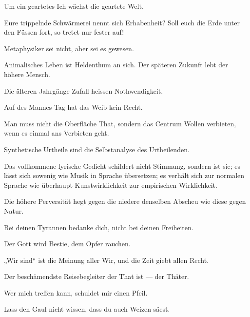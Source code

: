 Um ein geartetes Ich wächst die geartete Welt.
\par

Eure trippelnde Schwärmerei nennt sich Erhabenheit? Soll euch die Erde unter den Füssen fort, so tretet nur fester auf!
\par

Metaphysiker sei nicht, aber sei es gewesen.
\par

Animalisches Leben ist Heldenthum an sich. Der späteren Zukunft lebt der höhere Mensch.
\par

Die älteren Jahrgänge Zufall heissen Nothwendigkeit.
\par

Auf des Mannes Tag hat das Weib kein Recht.
\par

Man muss nicht die Oberfläche That, sondern das Centrum Wollen verbieten, wenn es einmal ans Verbieten geht.
\par

Synthetische Urtheile sind die Selbstanalyse des Urtheilenden.
\par

Das vollkommene lyrische Gedicht schildert nicht Stimmung, sondern ist sie; es lässt sich sowenig wie Musik in Sprache übersetzen; es verhält sich zur normalen Sprache wie überhaupt Kunstwirklichkeit zur empirischen Wirklichkeit.
\par

Die höhere Perversität hegt gegen die niedere denselben Abscheu wie diese gegen Natur.
\par

Bei deinen Tyrannen bedanke dich, nicht bei deinen Freiheiten.
\par

Der Gott wird Bestie, dem Opfer rauchen.
\par

„Wir sind“ ist die Meinung aller Wir, und die Zeit giebt allen Recht.
\par

Der beschämendste Reisebegleiter der That ist — der Thäter.
\par

Wer mich treffen kann, schuldet mir einen Pfeil.
\par

Lass den Gaul nicht wissen, dass du auch Weizen säest.
\par

